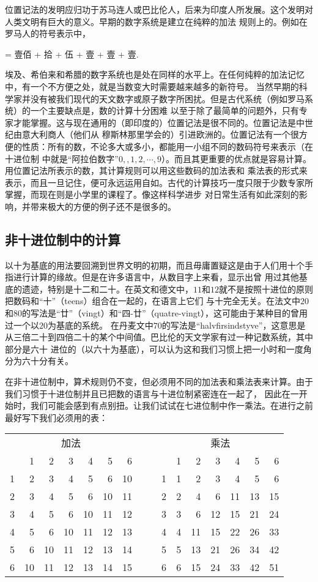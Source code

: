 位置记法的发明应归功于苏马连人或巴比伦人，后来为印度人所发展。这个发明对人类文明有巨大的意义。早期的数字系统是建立在纯粹的加法
规则上的。例如在罗马人的符号表示中，
\begin{center}
\uppercase\expandafter{} =  壹佰 + 拾 + 伍 + 壹 + 壹 + 壹.
\end{center}
埃及、希伯来和希腊的数字系统也是处在同样的水平上。在任何纯粹的加法记忆中，有一个不方便之处，就是当数变大时需要越来越多的新符号。
当然早期的科学家并没有被我们现代的天文数字或原子数字所困扰。但是古代系统（例如罗马系统）的一个主要缺点是，数的计算十分困难
以至于除了最简单的问题外，只有专家才能掌握。这与现在通用的（即印度的）位置记法是很不同的。位置记法是中世纪由意大利商人（他们从
穆斯林那里学会的）引进欧洲的。位置记法有一个很方便的性质：所有的数，不论多大或多小，都能用一小组不同的数码符号来表示（在十进位制
中就是“阿拉伯数字”$0,,1,2,\cdots,9$）。而且其更重要的优点就是容易计算。用位置记法所表示的数，其计算规则可以用这些数码的加法表和
乘法表的形式来表示，而且一旦记住，便可永远运用自如。古代的计算技巧一度只限于少数专家所掌握，而现在则是小学里的课程了。像这样科学进步
对日常生活有如此深刻的影响，并带来极大的方便的例子还不是很多的。
\subsection{非十进位制中的计算}
以十为基底的用法要回溯到世界文明的初期，而且毋庸置疑这是由于人们用十个手指进行计算的缘故。但是在许多语言中，从数目字上来看，显示出曾
用过其他基底的遗迹，特别是十二和二十。在英文和德文中，$11$和$12$就不是按照十进位的原则把数码和“十”（teens）组合在一起的，在语言上它们
与十完全无关。在法文中$20$和$80$的写法是“廿”（vingt）和“四-廿”（quatre-vingt），这可能由于某种目的曾用过一个以$20$为基底的系统。
在丹麦文中$70$的写法是“halvfirsindstyve”，这意思是从三倍二十到四倍二十的某个中间值。巴比伦的天文学家有过一种记数系统，其中部分是六十
进位的（以六十为基底），可以认为这和我们习惯上把一小时和一度角分为六十分有关。

在非十进位制中，算术规则仍不变，但必须用不同的加法表和乘法表来计算。由于我们习惯于十进位制并且已把数的语言与十进位制紧密连在一起了，
因此在一开始时，我们可能会感到有点别扭。让我们试试在七进位制中作一乘法。在进行之前最好写下我们必须用的表：
\newpage
\begin{center}
\begin{tabular}{c|rrrrrrccc|rrrrrr}
\multicolumn{7}{c}{加法} & & & \multicolumn{7}{c}{乘法} \\
  & 1 & 2 & 3 & 4 & 5 & 6  & & & & 1 & 2 & 3 & 4 & 5 & 6 \\
\cline{1-7}\cline{10-16}
1 & 2 & 3 & 4 & 5 & 6 & 10 & & &1& 1 & 2 & 3 & 4 & 5 & 6 \\
2 & 3 & 4 & 5 & 6 & 10& 11 & & &2& 2 & 4 & 6 & 11& 13& 15 \\
3 & 4 & 5 & 6 & 10& 11& 12 & & &3& 3 & 6 & 12& 15& 21& 24 \\
4 & 5 & 6 & 10& 11& 12& 13 & & &4& 4 & 11& 15& 22& 26& 33 \\
5 & 6 & 10& 11& 12& 13& 14 & & &5& 5 & 13& 21& 26& 34& 42 \\
6 & 10& 11& 12& 13& 14& 15 & & &6& 6 & 15& 24& 33& 42& 51 \\
\end{tabular}
\end{center}

